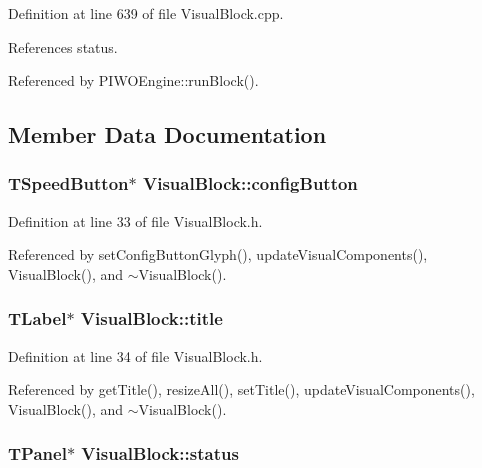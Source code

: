Definition at line 639 of file VisualBlock.cpp.

References status.

Referenced by PIWOEngine::runBlock().

\subsection{Member Data Documentation}
\hypertarget{classVisualBlock_12c5a7d37bad2fe96c1e681193e46692}{
\subsubsection[configButton]{\setlength{\rightskip}{0pt plus 5cm}TSpeedButton$\ast$ {\bf VisualBlock::configButton}}}
\label{classVisualBlock_12c5a7d37bad2fe96c1e681193e46692}




Definition at line 33 of file VisualBlock.h.

Referenced by setConfigButtonGlyph(), updateVisualComponents(), VisualBlock(), and $\sim$VisualBlock().\hypertarget{classVisualBlock_fb8a08d0bdaabd2f2c9331c73b327e94}{
\subsubsection[title]{\setlength{\rightskip}{0pt plus 5cm}TLabel$\ast$ {\bf VisualBlock::title}}}
\label{classVisualBlock_fb8a08d0bdaabd2f2c9331c73b327e94}




Definition at line 34 of file VisualBlock.h.

Referenced by getTitle(), resizeAll(), setTitle(), updateVisualComponents(), VisualBlock(), and $\sim$VisualBlock().\hypertarget{classVisualBlock_848de7730beb758d3c427f99ab78deaf}{
\subsubsection[status]{\setlength{\rightskip}{0pt plus 5cm}TPanel$\ast$ {\bf VisualBlock::status}}}
\label{classVisualBlock_848de7730beb758d3c427f99ab78deaf}




